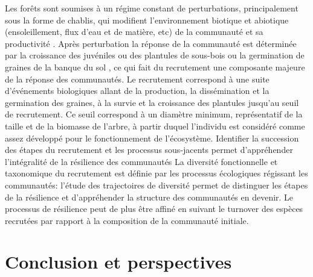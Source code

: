 \documentclass[
  11pt,
  french,
  A4paper,
  extrafontsizes,onecolumn,openright
  ]{memoir}
\begin{document}
Les forêts sont soumises à un régime constant de perturbations,
principalement sous la forme de chablis, qui modifient l'environnement
biotique et abiotique (ensoleillement, flux d'eau et de matière, etc) de
la communauté et sa productivité \autocite{Otani2018}. Après
perturbation la réponse de la communauté est déterminée par la
croissance des juvéniles ou des plantules de sous-bois ou la germination
de graines de la banque du sol
\autocites{Denslow1980}{Schnitzer2001}{Asner2004}, ce qui fait du
recrutement une composante majeure de la réponse des communautés. Le
recrutement correspond à une suite d'événements biologiques allant de la
production, la dissémination et la germination des graines, à la survie
et la croissance des plantules jusqu'au seuil de recrutement. Ce seuil
correspond à un diamètre minimum, représentatif de la taille et de la
biomasse de l'arbre, à partir duquel l'individu est considéré comme
assez développé pour le fonctionnement de l'écosystème. Identifier la
succession des étapes du recrutement et les processus sous-jacents
permet d'appréhender l'intégralité de la résilience des communautés La
diversité fonctionnelle et taxonomique du recrutement est définie par
les processus écologiques régissant les communautés: l'étude des
trajectoires de diversité permet de distinguer les étapes de la
résilience et d'appréhender la structure des communautés en devenir. Le
processus de résilience peut de plus être affiné en suivant le turnover
des espèces recrutées par rapport à la composition de la communauté
initiale.

\chapter{Conclusion et perspectives}\label{conclusion-et-perspectives}



\backmatter
\SmallMargins

%
\printbibliography










\evenpage
\SmallMargins
\thispagestyle{empty}
\end{document}
